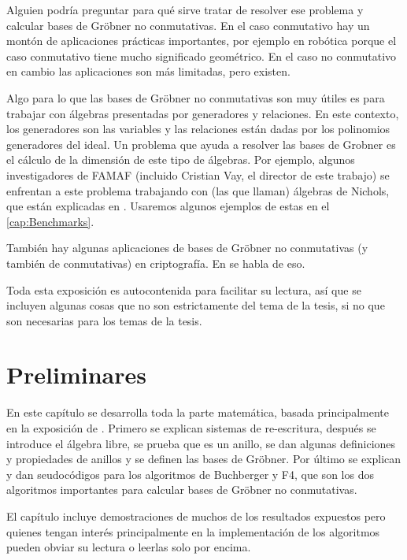 \documentclass[12pt]{report}
\theoremstyle{customstyle}
\theoremstyle{factstyle}
\begin{document}
Alguien podría preguntar para qué sirve tratar de resolver ese problema y calcular bases de Gröbner no conmutativas. En el caso conmutativo hay un montón de aplicaciones prácticas importantes, por ejemplo en robótica porque el caso conmutativo tiene mucho significado geométrico. En el caso no conmutativo en cambio las aplicaciones son más limitadas, pero existen.

Algo para lo que las bases de Gröbner no conmutativas son muy útiles es para trabajar con álgebras presentadas por generadores y relaciones. En este contexto, los generadores son las variables y las relaciones están dadas por los polinomios generadores del ideal. Un problema que ayuda a resolver las bases de Grobner es el cálculo de la dimensión de este tipo de álgebras. Por ejemplo, algunos investigadores de FAMAF (incluido Cristian Vay, el director de este trabajo) se enfrentan a este problema trabajando con (las que llaman) álgebras de Nichols, que están explicadas en \cite{book:introNichols}. Usaremos algunos ejemplos de estas en el \cref{cap:Benchmarks}.

También hay algunas aplicaciones de bases de Gröbner no conmutativas (y también de conmutativas) en criptografía. En \cite{article:crypto_gb} se habla de eso.

Toda esta exposición es autocontenida para facilitar su lectura, así que se incluyen algunas cosas que no son estrictamente del tema de la tesis, si no que son necesarias para los temas de la tesis. %

\chapter{Preliminares}\label{cap:Preliminares}

En este capítulo se desarrolla toda la parte matemática, basada principalmente en la exposición de \cite{thesis:Hof20}. Primero se explican sistemas de re-escritura, después se introduce el álgebra libre, se prueba que es un anillo, se dan algunas definiciones y propiedades de anillos y se definen las bases de Gröbner. Por último se explican y dan seudocódigos para los algoritmos de Buchberger y F4, que son los dos algoritmos importantes para calcular bases de Gröbner no conmutativas.

El capítulo incluye demostraciones de muchos de los resultados expuestos pero quienes tengan interés principalmente en la implementación de los algoritmos pueden obviar su lectura o leerlas solo por encima.
\end{document}

